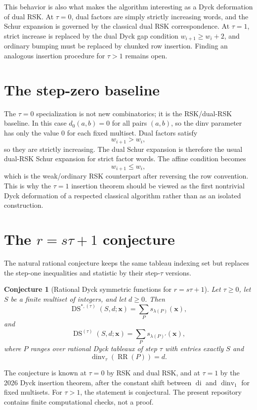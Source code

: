 \documentclass{article}
\DeclareMathOperator{\dinv}{dinv}
\DeclareMathOperator{\di}{di}
\DeclareMathOperator{\RR}{RR}
\newcommand{\DS}{\operatorname{DS}}
\newtheorem{conjecture}{Conjecture}
\begin{document}
This behavior is also what makes the algorithm interesting as a Dyck
deformation of dual RSK.  At \(\tau=0\), dual factors are simply strictly
increasing words, and the Schur expansion is governed by the classical dual
RSK correspondence.  At \(\tau=1\), strict increase is replaced by the dual
Dyck gap condition \(w_{i+1}\ge w_i+2\), and ordinary bumping must be replaced
by chunked row insertion.  Finding an analogous insertion procedure for
\(\tau>1\) remains open.

\section{The step-zero baseline}

The \(\tau=0\) specialization is not new combinatorics; it is the RSK/dual-RSK
baseline.  In this case \(d_0(a,b)=0\) for all pairs \((a,b)\), so the dinv
parameter has only the value \(0\) for each fixed multiset.  Dual factors
satisfy
\[
  w_{i+1}>w_i,
\]
so they are strictly increasing.  The dual Schur expansion is therefore the
usual dual-RSK Schur expansion for strict factor words.  The affine condition
becomes
\[
  w_{i+1}\le w_i,
\]
which is the weak/ordinary RSK counterpart after reversing the row convention.
This is why the \(\tau=1\) insertion theorem should be viewed as the first
nontrivial Dyck deformation of a respected classical algorithm rather than as
an isolated construction.

\section{The $r=s\tau+1$ conjecture}

The natural rational conjecture keeps the same tableau indexing set but
replaces the step-one inequalities and statistic by their step-\(\tau\)
versions.

\begin{conjecture}[Rational Dyck symmetric functions for \(r=s\tau+1\)]
Let \(\tau\ge0\), let \(S\) be a finite multiset of integers, and let
\(d\ge0\).  Then
\[
  \operatorname{DS}^{\ast,(\tau)}(S,d;\mathbf x)
  =
  \sum_P s_{\lambda(P)}(\mathbf x),
\]
and
\[
  \DS^{(\tau)}(S,d;\mathbf x)
  =
  \sum_P s_{\lambda(P)'}(\mathbf x),
\]
where \(P\) ranges over rational Dyck tableaux of step \(\tau\) with entries
exactly \(S\) and
\[
  \dinv_\tau(\RR(P))=d.
\]
\end{conjecture}

The conjecture is known at \(\tau=0\) by RSK and dual RSK, and at \(\tau=1\)
by the 2026 Dyck insertion theorem, after the constant shift between \(\di\)
and \(\dinv_1\) for fixed multisets.  For \(\tau>1\), the statement is
conjectural.  The present repository contains finite computational checks, not
a proof.
\end{document}
